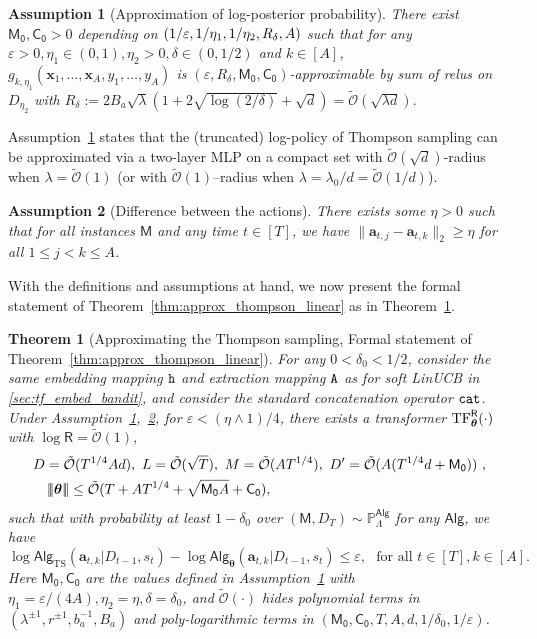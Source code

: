 \documentclass[10pt]{article}
\newtheorem{theorem}{Theorem}
\newtheorem{assumption}{Assumption}
\newcommand{\eps}{\varepsilon}
\newcommand{\<}{\left\langle}
\renewcommand{\>}{\right\rangle}
\newcommand{\TF}{{\rm TF}}
\newcommand{\nrmp}[1]{{\left|\!\left|\!\left|{#1}\right|\!\right|\!\right|}}
\renewcommand{\P}{\mathbb{P}}
\newcommand{\inst}{{\mathsf{M}}}
\newcommand{\TS}{{\mathrm{TS}}}
\newcommand{\Tpsparn}{{r}}
\newcommand{\trunprob}{{\eta_1}}
\newcommand{\Trunreg}{{D}}
\newcommand{\Trunregpa}{{\eta_2}}
\newcommand{\Trunregp}{{\eta}}
\newcommand{\tcO}{{\tilde{\mathcal O}}}
\newcommand{\state}{{s}}
\newcommand{\totlen}{{T}}
\newcommand{\cat}{{\tt cat}}
\newcommand{\extractmap}{{\tt A}}
\newcommand{\embedmap}{{\tt h}}
\newcommand{\sAlg}{{\mathsf{Alg}}}
\newcommand{\dset}{{D}}
\newcommand{\prior}{{\Lambda}}
\newcommand{\tfpar}{{\btheta}}
\newcommand{\hidden}{{D'}}
\newcommand{\clipval}{{\mathsf{R}}}
\newcommand{\neuron}{{\mathsf{M_0}}}
\newcommand{\weightn}{{{\mathsf{C_0}}}}
\def\btheta{{\boldsymbol \theta}}
\def\ba{{\mathbf a}}
\def\bx{{\mathbf x}}
\begin{document}
\begin{assumption}[Approximation of log-posterior probability]\label{ass:thompson_mlp_approx_linear}
 There exist  $\neuron,\weightn>0$  depending on $(1/\eps,1/\trunprob,\\1/\Trunregpa,R_\delta,A)$  such that for any $\eps>0,\trunprob\in(0,1),\Trunregpa>0,\delta\in(0,1/2)$ and $k\in[A]$, $g_{k,\trunprob}(\bx_1,\ldots,\bx_A,y_1,\ldots,y_A)$ is $(\eps,R_\delta,\neuron,\weightn)$-approximable by sum of relus on $\Trunreg_\Trunregpa$ with
$
R_\delta:=2B_a\sqrt{\lambda}(1+2\sqrt{\log(2/\delta)}+\sqrt{d})=\tcO(\sqrt{\lambda d}).
$
\end{assumption}
Assumption~\ref{ass:thompson_mlp_approx_linear} states that the (truncated) log-policy of  Thompson sampling  can be approximated via a two-layer MLP on a compact set with  $\tcO(\sqrt{d})$-radius when $\lambda=\tcO(1)$ (or with $\tcO(1)$--radius when $\lambda=\lambda_0/d=\tcO(1/d)$).
\begin{assumption}[Difference between the actions]\label{ass:thompson_mlp_diff_action_linear}
 There exists some $\Trunregp>0$  such that for all instances $\inst$ and any time $t\in[T]$, we have $\|\ba_{t,j}-\ba_{t,k}\|_2\geq\Trunregp$ for all $1\leq j< k\leq A$.
\end{assumption}
With the definitions and assumptions at hand, we now present the formal statement of Theorem~\ref{thm:approx_thompson_linear} as in Theorem~\ref{thm:approx_thompson_linear-formal}.
\begin{theorem}[Approximating the Thompson sampling, Formal statement of Theorem~\ref{thm:approx_thompson_linear}]\label{thm:approx_thompson_linear-formal}
For any $0<\delta_0<1/2$, consider the same embedding mapping $\embedmap$ and extraction mapping $\extractmap$ as for soft LinUCB in \ref{sec:tf_embed_bandit},
and consider the standard concatenation operator $\cat$. Under Assumption~\ref{ass:thompson_mlp_approx_linear},~\ref{ass:thompson_mlp_diff_action_linear}, for $\eps<(\Trunregp\wedge1)/4$, there exists a  transformer $\TF_\btheta^{\clipval}(\cdot)$ with $\log \clipval = \tcO(1)$,
\begin{align}
&D=\tcO(T^{1/4}Ad),~L= \tcO(\sqrt{T}),~ M =\tcO(AT^{1/4}),~\hidden=\tcO(A(T^{1/4}d+\neuron))~,\notag\\
&~~~\nrmp{\btheta}\leq \tcO(T+AT^{1/4}+\sqrt{ \neuron A}+\weightn),\label{eq:ts_tf_param-formal}
\end{align}
such that with probability at least $1-\delta_0$ over $(\inst, \dset_{\totlen}) \sim \P_{\prior}^{\sAlg}$ for any $\sAlg$, we have
\[
\log \sAlg_{\TS}(\ba_{t,k}|\dset_{t-1},\state_t) - \log \sAlg_{\tfpar}(\ba_{t,k}|\dset_{t-1},\state_t) \leq \eps, ~~~ \text{for all } t\in[T],k\in[A].
\]
Here  $\neuron,\weightn$ are the values defined in   Assumption~\ref{ass:thompson_mlp_approx_linear} with $\trunprob=\eps/(4A),\Trunregpa=\Trunregp,\delta=\delta_0$, and $\tcO(\cdot)$ hides polynomial terms in $(\lambda^{\pm1},\Tpsparn^{\pm1},b_a^{-1},B_a)$ and poly-logarithmic terms in $(\neuron,\weightn,\totlen,A,d,1/\delta_0,1/\eps)$.
\end{theorem}
\end{document}
